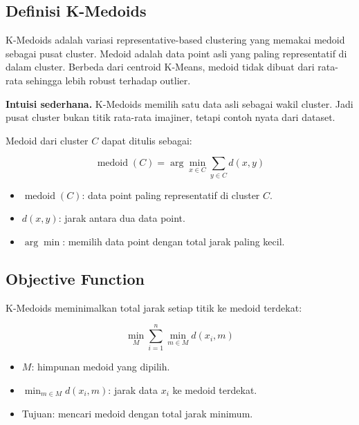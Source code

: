 \documentclass{article}
\newcommand{\infobox}[2]{%
  \par\vspace{0.6em}
  \noindent\colorbox{#1}{%
    \begin{minipage}{0.96\textwidth}
    \vspace{0.65em}
    #2
    \vspace{0.65em}
    \end{minipage}}
  \par\vspace{0.8em}
}
\begin{document}
\subsection{Definisi K-Medoids}

K-Medoids adalah variasi representative-based clustering yang memakai medoid sebagai pusat cluster. Medoid adalah data point asli yang paling representatif di dalam cluster. Berbeda dari centroid K-Means, medoid tidak dibuat dari rata-rata sehingga lebih robust terhadap outlier.
\infobox{softOrange}{\textbf{Intuisi sederhana.} K-Medoids memilih satu data asli sebagai wakil cluster. Jadi pusat cluster bukan titik rata-rata imajiner, tetapi contoh nyata dari dataset.}

Medoid dari cluster $C$ dapat ditulis sebagai:

\begin{equation}
\operatorname{medoid}(C)=\arg\min_{x\in C}\sum_{y\in C}d(x,y)
\end{equation}
\begin{itemize}[leftmargin=*]
    \item $\operatorname{medoid}(C)$: data point paling representatif di cluster $C$.
    \item $d(x,y)$: jarak antara dua data point.
    \item $\arg\min$: memilih data point dengan total jarak paling kecil.
\end{itemize}

\subsection{Objective Function}

K-Medoids meminimalkan total jarak setiap titik ke medoid terdekat:

\begin{equation}
\min_{M}\sum_{i=1}^{n}\min_{m\in M}d(x_i,m)
\end{equation}
\begin{itemize}[leftmargin=*]
    \item $M$: himpunan medoid yang dipilih.
    \item $\min_{m\in M}d(x_i,m)$: jarak data $x_i$ ke medoid terdekat.
    \item Tujuan: mencari medoid dengan total jarak minimum.
\end{itemize}
\end{document}
